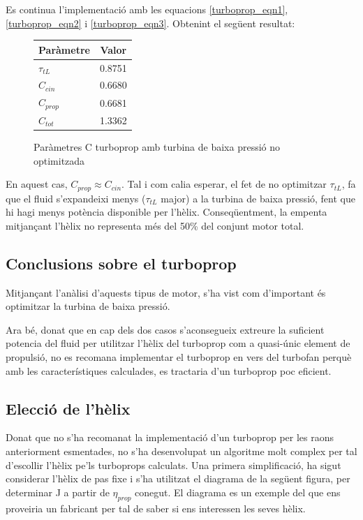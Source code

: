 \noindent Es continua l'implementació amb les equacions \ref{turboprop_eqn1}, \ref{turboprop_eqn2} i \ref{turboprop_eqn3}. Obtenint el següent resultat:
\begin{figure}[H]
	\centering
	\begin{tabular}{lc}
		\toprule[3pt]
		\textbf{Paràmetre}&\textbf{Valor}\\
		\midrule[1pt]
		$\tau_{tL}$ & 0.8751\\
		$C_{cin}$ & 0.6680\\
		$C_{prop}$ & 0.6681\\
		$C_{tot}$ & 1.3362\\
		
		\bottomrule[2pt]
	\end{tabular}
	\label{C_opti2}
	\caption{Paràmetres C turboprop amb turbina de baixa pressió no optimitzada}
\end{figure}
\noindent En aquest cas, $C_{prop}\approx C_{cin}$. Tal i com calia esperar, el fet de no optimitzar $\tau_{tL}$, fa que el fluid s'expandeixi menys ($\tau_{tL}$ major) a la turbina de baixa pressió, fent que hi hagi menys potència disponible per l'hèlix. Conseqüentment, la empenta mitjançant l'hèlix no representa més del 50\% del conjunt motor total.

\subsection{Conclusions sobre el turboprop}
Mitjançant l'anàlisi d'aquests tipus de motor, s'ha vist com d'important és optimitzar la turbina de baixa pressió.

\noindent Ara bé, donat que en cap dels dos casos s'aconsegueix extreure la suficient potencia del fluid per utilitzar l'hèlix del turboprop com a quasi-únic element de propulsió, no es recomana implementar el turboprop en vers del turbofan perquè amb les característiques calculades, es tractaria d'un turboprop poc eficient.

\subsection{Elecció de l'hèlix}
Donat que no s'ha recomanat la implementació d'un turboprop per les raons anteriorment esmentades, no s'ha desenvolupat un algoritme molt complex per tal d'escollir l'hèlix pe'ls turboprops calculats. Una primera simplificació, ha sigut considerar l'hèlix de pas fixe i s'ha utilitzat el diagrama de la següent figura, per determinar J a partir de $\eta_{prop}$ conegut. El diagrama es un exemple del que ens proveiria un fabricant per tal de saber si ens interessen les seves hèlix.

